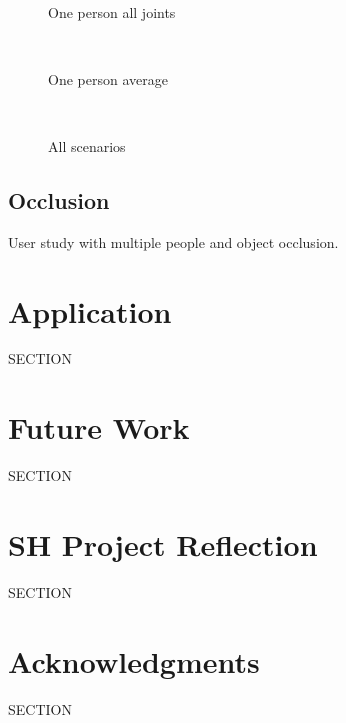 \documentclass{sigchi}
\begin{document}
\begin{figure}
  \centering
  
  \caption{One person all joints}~\label{fig:one_person_all}
\end{figure}

\begin{figure}
  \centering
  
  \caption{One person average}~\label{fig:one_person_average}
\end{figure}

\begin{figure}
  \centering
  
  \caption{All scenarios}~\label{fig:scenarios}
\end{figure}

\subsection{Occlusion}

User study with multiple people and object occlusion.

\section{Application}

SECTION

\section{Future Work}

SECTION

\section{SH Project Reflection}

SECTION

\section{Acknowledgments}

SECTION

%
%
%
%
%
\balance{}



\end{document}
